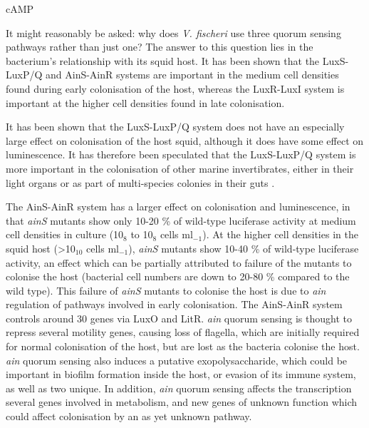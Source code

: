  \label{sec:cAMP}

cAMP


It might reasonably be asked: why does \textit{V. fischeri} use three quorum sensing pathways rather than just one? The answer to this question lies in the bacterium's relationship with its squid host. It has been shown that the LuxS-LuxP/Q and AinS-AinR systems are important in the medium cell densities found during early colonisation of the host, whereas the LuxR-LuxI system is important at the higher cell densities found in late colonisation\cite{Lupp2003,Lupp2005}.

It has been shown that the LuxS-LuxP/Q system does not have an especially large effect on colonisation of the host squid, although it does have some effect on luminescence\cite{Lupp2004}. It has therefore been speculated that the LuxS-LuxP/Q system is more important in the colonisation of other marine invertibrates, either in their light organs\cite{Ruby1976,Reichelt1977} or as part of multi-species colonies in their guts \cite{Lupp2004,Ramesh1986}.

The AinS-AinR system has a larger effect on colonisation and luminescence, in that \textit{ainS} mutants show only 10-20 \% of wild-type luciferase activity at medium cell densities in culture (10$_8$ to 10$_8$ cells ml$_{-1}$)\cite{Lupp2003}. At the higher cell densities in the squid host (>10$_{10}$ cells ml$_{-1}$), \textit{ainS} mutants show 10-40 \% of wild-type luciferase activity, an effect which can be partially attributed to failure of the mutants to colonise the host (bacterial cell numbers are down to 20-80 \% compared to the wild type).
This failure of \textit{ainS} mutants to colonise the host is due to \textit{ain} regulation of pathways involved in early colonisation. The AinS-AinR system controls around 30 genes via LuxO and LitR\cite{Lupp2005}. \textit{ain} quorum sensing is thought to repress several motility genes, causing loss of flagella, which are initially required for normal colonisation of the host\cite{Millikan2002a,Graf1994}, but are lost as the bacteria colonise the host\cite{Ruby1993}. 
\textit{ain} quorum sensing also induces a putative exopolysaccharide, which could be important in biofilm formation inside the host, or evasion of its immune system\cite{Roberts1996}, as well as two unique.
In addition, \textit{ain} quorum sensing affects the transcription several genes involved in metabolism, and new genes of unknown function which could affect colonisation by an as yet unknown pathway.

